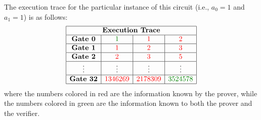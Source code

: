 The execution trace for the particular instance of this circuit (i.e., $a_0 = 1$ and $a_1 = 1$) is as follows:
\[
\begin{array}{|c|c|c|c|}
\hline
\multicolumn{4}{|c|}{\textbf{Execution Trace}} \\\hline
\textbf{Gate 0} & {\color{green!50!black} 1} & {\color{red} 1} & {\color{red} 2} \\\hline
\textbf{Gate 1} & {\color{red} 1} & {\color{red} 2} & {\color{red} 3} \\\hline
\textbf{Gate 2} & {\color{red} 2} & {\color{red} 3} & {\color{red} 5} \\\hline
\vdots & \vdots & \vdots & \vdots \\\hline
\textbf{Gate 32} & {\color{red} 1346269} & {\color{red} 2178309} & {\color{green!50!black} 3524578} \\
\hline
\end{array}
\]
where the numbers colored in red are the information known by the prover, while the numbers colored in green are the information known to both the prover and the verifier.

